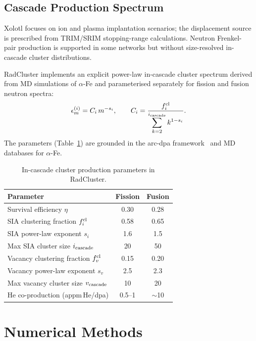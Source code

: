 \documentclass[12pt,letterpaper]{article}
\begin{document}
\subsection{Cascade Production Spectrum}

Xolotl focuses on ion and plasma implantation scenarios; the
displacement source is prescribed from TRIM/SRIM stopping-range
calculations.  Neutron Frenkel-pair production is supported in some
networks but without size-resolved in-cascade cluster distributions.

RadCluster implements an explicit power-law in-cascade cluster spectrum
derived from MD simulations of $\alpha$-Fe and parameterised
separately for fission and fusion neutron spectra:
\begin{equation}
  \epsilon_m^{(i)} = C_i\,m^{-s_i},
  \qquad
  C_i = \frac{f_i^{\rm cl}}{\displaystyle\sum_{k=2}^{i_{\rm cascade}}k^{1-s_i}}.
\end{equation}
The parameters (Table~\ref{tab:cascade}) are grounded in the arc-dpa
framework~\cite{Nordlund2018} and MD databases for $\alpha$-Fe.

\begin{table}[htbp]
\centering
\caption{In-cascade cluster production parameters in RadCluster.}
\label{tab:cascade}
\renewcommand{\arraystretch}{1.15}
\begin{tabular}{@{}lcc@{}}
\toprule
\textbf{Parameter} & \textbf{Fission} & \textbf{Fusion} \\
\midrule
Survival efficiency $\eta$ & 0.30 & 0.28 \\
SIA clustering fraction $f_i^{\rm cl}$ & 0.58 & 0.65 \\
SIA power-law exponent $s_i$ & 1.6 & 1.5 \\
Max SIA cluster size $i_{\rm cascade}$ & 20 & 50 \\
Vacancy clustering fraction $f_v^{\rm cl}$ & 0.15 & 0.20 \\
Vacancy power-law exponent $s_v$ & 2.5 & 2.3 \\
Max vacancy cluster size $v_{\rm cascade}$ & 10 & 20 \\
He co-production (appm\,He/dpa) & 0.5--1 & $\sim$10 \\
\bottomrule
\end{tabular}
\end{table}

\section{Numerical Methods}
\label{sec:numerics}
\end{document}
